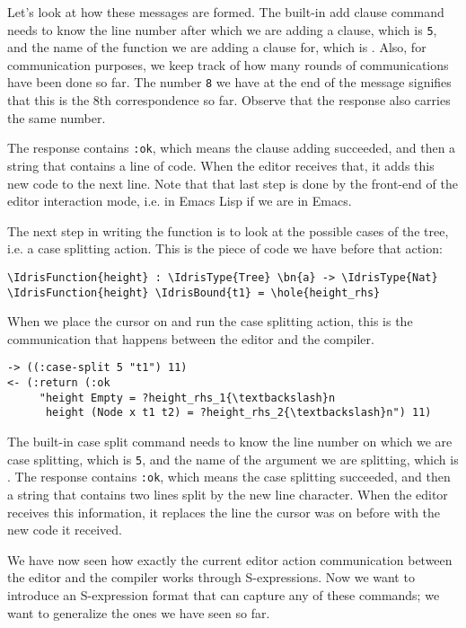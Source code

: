Let's look at how these messages are formed. The built-in add clause command
needs to know the line number after which we are adding a clause, which is
\texttt{5}, and the name of the function we are adding a clause for, which is
.
Also, for communication purposes, we keep track of how many rounds of
communications have been done so far. The number \texttt{8} we have at the end
of the message signifies that this is the 8th correspondence so far.
Observe that the response also carries the same number.

The response contains \texttt{:ok}, which means the clause adding succeeded,
and then a string that contains a line of code.
When the editor receives that, it adds this new code to the next
line. Note that that last step is done by the front-end of the editor
interaction mode, i.e. in Emacs Lisp if we are in Emacs.

The next step in writing the function  is to look at the possible
cases of the tree, i.e. a case splitting action. This is the piece of code we
have before that action:

\begin{Verbatim}[framesep=2mm, label=\footnotesize{\normalfont{Idris}}, labelposition=topline]
\IdrisFunction{height} : \IdrisType{Tree} \bn{a} -> \IdrisType{Nat}
\IdrisFunction{height} \IdrisBound{t1} = \hole{height_rhs}
\end{Verbatim}

When we place the cursor on  and run the case splitting action, this is
the communication that happens between the editor and the compiler.

\begin{Verbatim}[framesep=2mm, label=\footnotesize{\normalfont{S-expression}}, labelposition=topline]
-> ((:case-split 5 "t1") 11)
<- (:return (:ok
     "height Empty = ?height_rhs_1{\textbackslash}n
      height (Node x t1 t2) = ?height_rhs_2{\textbackslash}n") 11)
\end{Verbatim}

The built-in case split command needs to know the line number on which we are
case splitting, which is \texttt{5}, and the name of the argument we are
splitting, which is .  The response contains \texttt{:ok}, which means
the case splitting succeeded, and then a string that contains two lines split
by the new line character. When the editor receives this information, it
replaces the line the cursor was on before with the new code it received.

We have now seen how exactly the current editor action communication between
the editor and the compiler works through S-expressions.
Now we want to introduce an S-expression format that can capture any of these
commands; we want to generalize the ones we have seen so far.

